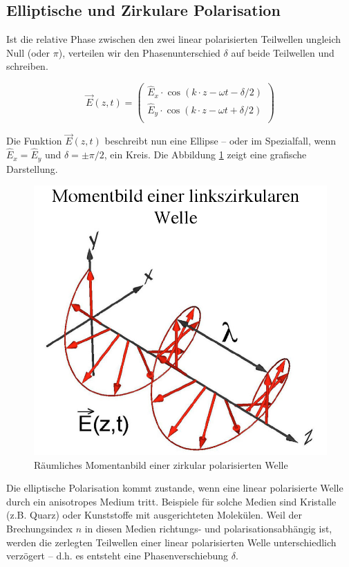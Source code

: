 \subsection{Elliptische und Zirkulare Polarisation}

Ist  die  relative  Phase  zwischen  den zwei  linear  polarisierten  Teilwellen
ungleich  Null  (oder  $\pi$),  verteilen wir den Phasenunterschied $\delta$ auf
beide Teilwellen und schreiben.

\begin{equation}
    \vec{E}(z,t) = \begin{pmatrix}
        \hat{E}_x\cdot\cos(k \cdot z - \omega t - \delta/2) \\
        \hat{E}_y\cdot\cos(k \cdot z - \omega t + \delta/2) \\
    \end{pmatrix}
    \label{eq:ellip}
\end{equation}

Die Funktion $\vec{E}(z,t)$  beschreibt nun eine Ellipse -- oder im Spezialfall,
wenn  $\hat{E}_x=\hat{E}_y$  und $\delta=\pm\pi/2$,  ein  Kreis.  Die  Abbildung
\ref{fig:zirkular_pol} zeigt eine grafische Darstellung.

\begin{figure}[H]
    \centering
    \includegraphics[width=.5\linewidth]{images/polarisation-zirkular.png}
    \caption{R\"aumliches Momentanbild einer zirkular polarisierten Welle}
    \label{fig:zirkular_pol}
\end{figure}

Die elliptische Polarisation kommt zustande, wenn eine linear polarisierte Welle
durch ein anisotropes Medium tritt. Beispiele f\"ur solche Medien sind Kristalle
(z.B.  Quarz)  oder  Kunststoffe  mit  ausgerichteten   Molek\"ulen.   Weil  der
Brechungsindex $n$ in diesen Medien richtungs- und polarisationsabh\"angig  ist,
werden die zerlegten Teilwellen einer linear polarisierten Welle unterschiedlich
verz\"ogert  -- d.h. es entsteht eine Phasenverschiebung $\delta$.

